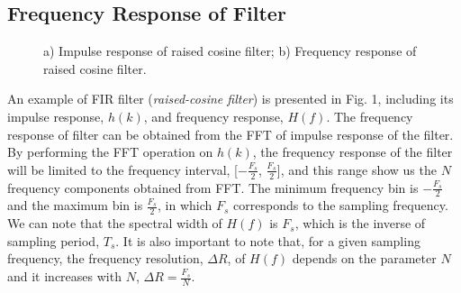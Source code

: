 \documentclass[a4paper]{article}
\begin{document}
\subsection{Frequency Response of Filter}
\begin{figure}[h!]
    \centering
    \qquad
    \caption{ a) Impulse response of raised cosine filter; b) Frequency response  of raised cosine filter. }%
    \label{BER_InputPower}%
\end{figure}
An example of FIR filter (\textit{raised-cosine filter}) is presented in Fig. 1, including its impulse response, $h(k)$, and frequency response, $H(f)$. The frequency response of filter can be obtained from the FFT of impulse response of the filter.
By performing the FFT operation on $h(k)$, the frequency response of the filter will be limited to the frequency interval, [$-\frac{F_s}{2}$, $\frac{F_s}{2}$], and this range show us the $N$ frequency components obtained from FFT. The minimum frequency bin is $-\frac{F_s}{2}$ and the maximum bin is $\frac{F_s}{2}$, in which $F_s$ corresponds to the sampling frequency. We can note that the spectral width of $H(f)$ is $F_s$, which is the inverse of sampling period, $T_s$. It is also important to note that, for a given sampling frequency, the frequency resolution, $\Delta R$, of $H(f)$ depends on the parameter $N$ and it increases with $N$, $\Delta R=\frac{F_s}{N}$.
\end{document}
